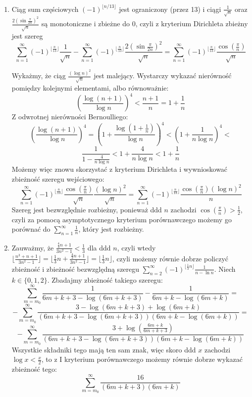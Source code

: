 \documentclass{../note}
\begin{document}
\begin{rozwiazanie}
\begin{enumerate}[label=(\alph*)]
\item Ciąg sum częściowych $(-1)^{\lfloor n/13 \rfloor}$ jest ograniczony (przez 13) i ciągi $\frac{1}{\sqrt{n}}$ oraz $\frac{2\left(\sin \frac{\pi}{2n}\right)^2}{\sqrt{n}}$ są monotoniczne i zbieżne do 0, czyli z kryterium Dirichleta zbieżny jest szereg
\[\sum_{n=1}^{\infty}(-1)^{\lfloor\frac{n}{13}\rfloor} \frac{1}{\sqrt{n}} - \sum_{n=1}^{\infty}(-1)^{\lfloor\frac{n}{13}\rfloor} \frac{2\left(\sin \frac{\pi}{2n}\right)^2}{\sqrt{n}} = \sum_{n=1}^{\infty}(-1)^{\lfloor\frac{n}{13}\rfloor} \frac{\cos(\frac{\pi}{n})}{\sqrt{n}}\]

Wykażmy, że ciąg $\frac{(\log n)^2}{\sqrt{n}}$ jest malejący. Wystarczy wykazać nierówność pomiędzy kolejnymi elementami, albo równoważnie:
$$ \left( \frac{\log(n+1)}{\log n} \right)^4 < \frac{n+1}{n} = 1 + \frac{1}{n} $$
Z odwrotnej nierówności Bernoulliego:
$$ \left(\frac{\log(n+1)}{\log n}\right)^4 = \left(1+\frac{\log(1+\frac{1}{n})}{\log n}\right)^4 < \left(1+\frac{1}{n \log n}\right)^4 <$$ $$ \frac{1}{1-\frac{4}{n \log n}}< 1 + \frac{4}{n \log n} < 1+\frac1n $$
Możemy więc znowu skorzystać z kryterium Dirichleta i wywnioskować zbieżność szeregu wejściowego:
\[\sum_{n=1}^{\infty}(-1)^{\lfloor\frac{n}{13}\rfloor} \frac{\cos(\frac{\pi}{n})}{\sqrt{n}} \frac{(\log n)^2}{\sqrt{n}} = \sum_{n=1}^{\infty}(-1)^{\lfloor\frac{n}{13}\rfloor}\frac{\cos(\frac{\pi}{n})(\log n)^{2}}{n}\]
Szereg jest bezwzględnie rozbieżny, ponieważ ddd $n$ zachodzi $\cos(\frac{\pi}{n}) > \frac{1}{2}$, czyli za pomocą asymptotycznego kryterium porównawczego możemy go porównać do $\sum_{n=1}^{\infty}\frac{1}{n}$, który jest rozbieżny.
    \item Zauważmy, że $\frac{\frac43 n + 1}{3n^2-1} < \frac13$ dla ddd $n$, czyli wtedy $\lfloor\frac{n^{3}+n+1}{3n^{2}-1}\rfloor = \lfloor \frac13n + \frac{\frac43 n + 1}{3n^2-1}\rfloor = \lfloor \frac13n\rfloor$, czyli możemy równie dobrze policzyć zbieżność i zbieżność bezwzględną szeregu $ \sum_{n=2}^{\infty}(-1)^{\lfloor \frac13n\rfloor}\frac{1}{n-\ln n} $. Niech $k \in \{0, 1, 2\}$. Zbadajmy zbieżność takiego szeregu:
    \[ \sum_{m=m_0}^{\infty}\frac{1}{6m+k+3-\log(6m+k+3)} - \frac{1}{6m+k-\log(6m+k)} =\]
    \[-\sum_{m=m_0}^{\infty}\frac{3-\log(6m+k+3)+\log(6m+k)}{(6m+k+3-\log(6m+k+3))(6m+k-\log(6m+k))}=\]
    \[-\sum_{m=m_0}^{\infty}\frac{3+\log\left(\frac{6m+k}{6m+k+3}\right)}{(6m+k+3-\log(6m+k+3))(6m+k-\log(6m+k))}\]
    Wszystkie składniki tego mają ten sam znak, więc skoro ddd $x$ zachodzi $\log x < \frac x2$, to z I kryterium porównawczego możemy równie dobrze wykazać zbieżność tego:
    \[\sum_{m=m_0}^{\infty}\frac{16}{(6m+k+3)(6m+k)}\]

\end{enumerate}
\end{rozwiazanie}
\end{document}
